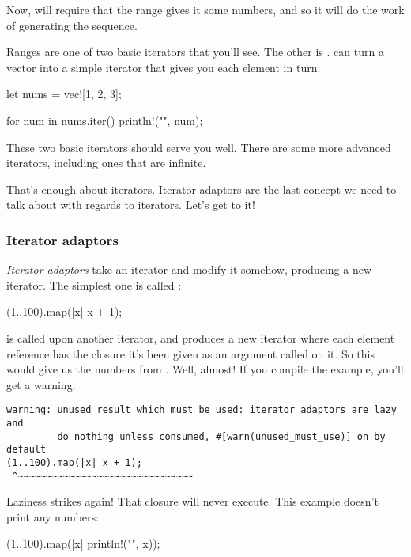 Now,  will require that the range gives it some numbers, and so it will do the work of generating the sequence.

\blank

Ranges are one of two basic iterators that you'll see. The other is .  can turn a vector into a simple 
iterator that gives you each element in turn:

\begin{rustc}
let nums = vec![1, 2, 3];

for num in nums.iter() {
   println!("{}", num);
}
\end{rustc}

These two basic iterators should serve you well. There are some more advanced iterators, including ones that are infinite.

\blank

That's enough about iterators. Iterator adaptors are the last concept we need to talk about with regards to iterators. Let's get to it!

\subsubsection*{Iterator adaptors}

\emph{Iterator adaptors} take an iterator and modify it somehow, producing a new iterator. The simplest one is called :

\begin{rustc}
(1..100).map(|x| x + 1);
\end{rustc}

 is called upon another iterator, and produces a new iterator where each element reference has the closure it's been given 
as an argument called on it. So this would give us the numbers from . Well, almost! If you compile the example, you'll 
get a warning:

\begin{verbatim}
warning: unused result which must be used: iterator adaptors are lazy and
         do nothing unless consumed, #[warn(unused_must_use)] on by default
(1..100).map(|x| x + 1);
 ^~~~~~~~~~~~~~~~~~~~~~~~~~~~~~~~
\end{verbatim}

Laziness strikes again! That closure will never execute. This example doesn't print any numbers:

\begin{rustc}
(1..100).map(|x| println!("{}", x));
\end{rustc}

